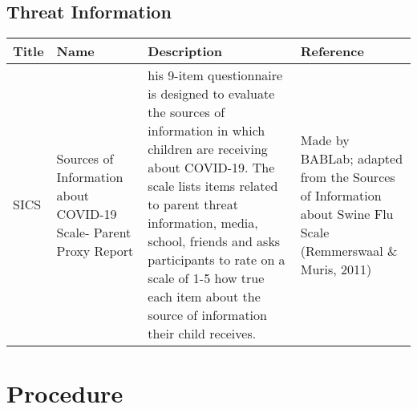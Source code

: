 \documentclass[]{book}
\begin{document}
\hypertarget{threat-information}{%
\subsection{Threat Information}\label{threat-information}}

\begin{longtable}[]{@{}llll@{}}
\toprule
\begin{minipage}[b]{0.22\columnwidth}\raggedright
Title\strut
\end{minipage} & \begin{minipage}[b]{0.27\columnwidth}\raggedright
Name\strut
\end{minipage} & \begin{minipage}[b]{0.22\columnwidth}\raggedright
Description\strut
\end{minipage} & \begin{minipage}[b]{0.18\columnwidth}\raggedright
Reference\strut
\end{minipage}\tabularnewline
\midrule
\endhead
\begin{minipage}[t]{0.22\columnwidth}\raggedright
SICS\strut
\end{minipage} & \begin{minipage}[t]{0.27\columnwidth}\raggedright
Sources of Information about COVID-19 Scale- Parent Proxy Report\strut
\end{minipage} & \begin{minipage}[t]{0.22\columnwidth}\raggedright
his 9-item questionnaire is designed to evaluate the sources of information in which children are receiving about COVID-19. The scale lists items related to parent threat information, media, school, friends and asks participants to rate on a scale of 1-5 how true each item about the source of information their child receives.\strut
\end{minipage} & \begin{minipage}[t]{0.18\columnwidth}\raggedright
Made by BABLab; adapted from the Sources of Information about Swine Flu Scale (Remmerswaal \& Muris, 2011)\strut
\end{minipage}\tabularnewline
\bottomrule
\end{longtable}

\hypertarget{procedure}{%
\section{Procedure}\label{procedure}}


\end{document}
